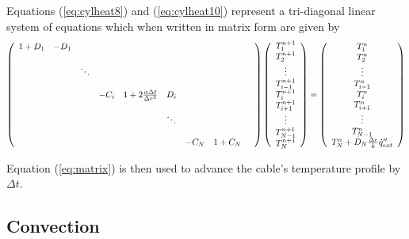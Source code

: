 Equations (\ref{eq:cylheat8}) and (\ref{eq:cylheat10}) represent a  tri-diagonal linear system of equations which when written in matrix form
are given by
\begin{equation}
\left(
\begin{array}{ccccccccc}
  1+D_1 & -D_1 &  &  &  &  &  &  &  \\
   &  &  &  &  &  &  &  &  \\
   &  &\ddots  &  &  &  &  &  &  \\
   &  &  &  &  &  &  &  &  \\
   &  &  & -C_i &1+2\frac{\alpha\Delta t}{\Delta r^2}  &D_i  &  &  &  \\
   &  &  &  &  &  &  &  &  \\
   &  &  &  &  & \ddots &  &  &  \\
   &  &  &  &  &  &  &  &  \\
   &  &  &  &  &  &-C_N  &1+C_N  &
\end{array}
\right)
\left(
  \begin{array}{c}
    T_1^{n+1}\\
    T_2^{n+1}\\
    \vdots\\
    T_{i-1}^{n+1} \\
    T_i^{n+1} \\
    T_{i+1}^{n+1}\\
    \vdots\\
    T_{N-1}^{n+1}\\
    T_N^{n+1}
  \end{array}
\right)
=
\left(
  \begin{array}{c}
    T_1^{n}\\
    T_2^{n}\\
    \vdots\\
    T_{i-1}^{n} \\
    T_i^{n} \\
    T_{i+1}^{n}\\
    \vdots\\
    T_{N-1}^{n}\\
    T_N^{n}+D_N\frac{\Delta r}{k}\dot{q}''_{ext}
  \end{array}
\right)
\label{eq:matrix}
\end{equation}

\noindent Equation (\ref{eq:matrix}) is then used to
advance the cable's temperature profile by $\Delta t$.

\subsection{Convection}

